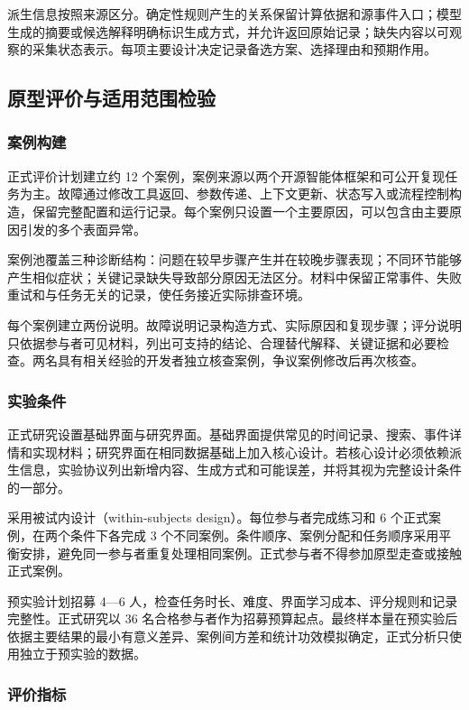派生信息按照来源区分。确定性规则产生的关系保留计算依据和源事件入口；模型生成的摘要或候选解释明确标识生成方式，并允许返回原始记录；缺失内容以可观察的采集状态表示。每项主要设计决定记录备选方案、选择理由和预期作用。

\subsection{原型评价与适用范围检验}

\subsubsection{案例构建}

正式评价计划建立约 12 个案例，案例来源以两个开源智能体框架和可公开复现任务为主。故障通过修改工具返回、参数传递、上下文更新、状态写入或流程控制构造，保留完整配置和运行记录。每个案例只设置一个主要原因，可以包含由主要原因引发的多个表面异常。

案例池覆盖三种诊断结构：问题在较早步骤产生并在较晚步骤表现；不同环节能够产生相似症状；关键记录缺失导致部分原因无法区分。材料中保留正常事件、失败重试和与任务无关的记录，使任务接近实际排查环境。

每个案例建立两份说明。故障说明记录构造方式、实际原因和复现步骤；评分说明只依据参与者可见材料，列出可支持的结论、合理替代解释、关键证据和必要检查。两名具有相关经验的开发者独立核查案例，争议案例修改后再次核查。

\subsubsection{实验条件}

正式研究设置基础界面与研究界面。基础界面提供常见的时间记录、搜索、事件详情和实现材料；研究界面在相同数据基础上加入核心设计。若核心设计必须依赖派生信息，实验协议列出新增内容、生成方式和可能误差，并将其视为完整设计条件的一部分。

采用被试内设计（within-subjects design）。每位参与者完成练习和 6 个正式案例，在两个条件下各完成 3 个不同案例。条件顺序、案例分配和任务顺序采用平衡安排，避免同一参与者重复处理相同案例。正式参与者不得参加原型走查或接触正式案例。

预实验计划招募 4—6 人，检查任务时长、难度、界面学习成本、评分规则和记录完整性。正式研究以 36 名合格参与者作为招募预算起点。最终样本量在预实验后依据主要结果的最小有意义差异、案例间方差和统计功效模拟确定，正式分析只使用独立于预实验的数据。

\subsubsection{评价指标}


